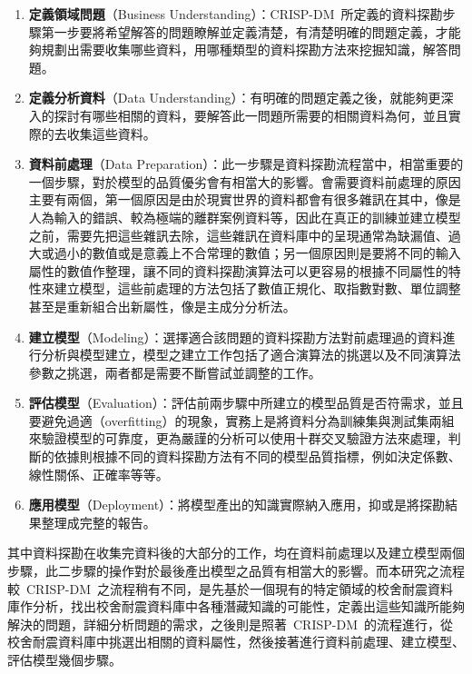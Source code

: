 \begin{enumerate}
\item \textbf{定義領域問題}（Business Understanding）：CRISP-DM~所定義的資料探勘步驟第一步要將希望解答的問題瞭解並定義清楚，有清楚明確的問題定義，才能夠規劃出需要收集哪些資料，用哪種類型的資料探勘方法來挖掘知識，解答問題。
\item \textbf{定義分析資料}（Data Understanding）：有明確的問題定義之後，就能夠更深入的探討有哪些相關的資料，要解答此一問題所需要的相關資料為何，並且實際的去收集這些資料。
\item \textbf{資料前處理}（Data Preparation）：此一步驟是資料探勘流程當中，相當重要的一個步驟，對於模型的品質優劣會有相當大的影響。會需要資料前處理的原因主要有兩個，第一個原因是由於現實世界的資料都會有很多雜訊在其中，像是人為輸入的錯誤、較為極端的離群案例資料等，因此在真正的訓練並建立模型之前，需要先把這些雜訊去除，這些雜訊在資料庫中的呈現通常為缺漏值、過大或過小的數值或是意義上不合常理的數值；另一個原因則是要將不同的輸入屬性的數值作整理，讓不同的資料探勘演算法可以更容易的根據不同屬性的特性來建立模型，這些前處理的方法包括了數值正規化、取指數對數、單位調整甚至是重新組合出新屬性，像是主成分分析法。
\item \textbf{建立模型}（Modeling）：選擇適合該問題的資料探勘方法對前處理過的資料進行分析與模型建立，模型之建立工作包括了適合演算法的挑選以及不同演算法參數之挑選，兩者都是需要不斷嘗試並調整的工作。
\item \textbf{評估模型}（Evaluation）：評估前兩步驟中所建立的模型品質是否符需求，並且要避免過適（overfitting）的現象，實務上是將資料分為訓練集與測試集兩組來驗證模型的可靠度，更為嚴謹的分析可以使用十群交叉驗證方法來處理，判斷的依據則根據不同的資料探勘方法有不同的模型品質指標，例如決定係數、線性關係、正確率等等。
\item \textbf{應用模型}（Deployment）：將模型產出的知識實際納入應用，抑或是將探勘結果整理成完整的報告。
\end{enumerate}

其中資料探勘在收集完資料後的大部分的工作，均在資料前處理以及建立模型兩個步驟，此二步驟的操作對於最後產出模型之品質有相當大的影響。而本研究之流程較~CRISP-DM~之流程稍有不同，是先基於一個現有的特定領域的校舍耐震資料庫作分析，找出校舍耐震資料庫中各種潛藏知識的可能性，定義出這些知識所能夠解決的問題，詳細分析問題的需求，之後則是照著~CRISP-DM~的流程進行，從校舍耐震資料庫中挑選出相關的資料屬性，然後接著進行資料前處理、建立模型、評估模型幾個步驟。

